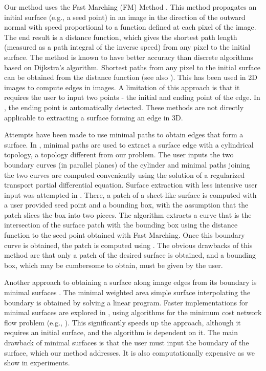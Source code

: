 \documentclass[10pt,journal,compsoc]{IEEEtran}
\begin{document}
Our method uses the Fast Marching (FM) Method
\cite{sethian1996fast}. This method propagates an initial surface
(e.g., a seed point) in an image in the direction of the outward
normal with speed proportional to a function defined at each pixel of
the image. The end result is a distance function, which gives the
shortest path length (measured as a path integral of the inverse
speed) from any pixel to the initial surface. The method is known to
have better accuracy than discrete algorithms based on Dijkstra's
algorithm. Shortest paths from any pixel to the initial surface can be
obtained from the distance function \cite{cohen1997global} (see also
\cite{ulen2015shortest}). This has been used in 2D images to compute
edges in images. A limitation of this approach is that it requires the
user to input two points - the initial and ending point of the
edge. In \cite{kaul2012detecting}, the ending point is automatically
detected. These methods are not directly applicable to extracting a
surface forming an edge in 3D.

Attempts have been made to use minimal paths to obtain edges that form
a surface. In \cite{ardon2005new,ardon2007new}, minimal paths are used
to extract a surface edge with a cylindrical topology, a topology
different from our problem. The user inputs the two boundary curves
(in parallel planes) of the cylinder and minimal paths joining the two
curves are computed conveniently using the solution of a regularized
transport partial differential equation. Surface extraction with less
intensive user input was attempted in
\cite{benmansour2009single}. There, a patch of a sheet-like surface is
computed with a user provided seed point and a bounding box, with the
assumption that the patch slices the box into two pieces. The
algorithm extracts a curve that is the intersection of the surface
patch with the bounding box using the distance function to the seed
point obtained with Fast Marching. Once this boundary curve is
obtained, the patch is computed using \cite{ardon2007new}. The obvious
drawbacks of this method are that only a patch of the desired surface
is obtained, and a bounding box, which may be cumbersome to obtain,
must be given by the user.

Another approach to obtaining a surface along image edges from its
boundary is minimal surfaces \cite{grady2006computing,
  grady2010minimal}. The minimal weighted area simple surface
interpolating the boundary is obtained by solving a linear
program. Faster implementations for minimal surfaces are explored in
\cite{grady2010minimal}, using algorithms for the minimum cost network
flow problem (e.g., \cite{goldberg1997efficient, kovacs2015minimum,
  brunsch2015smoothed, ford2015flows}). This significantly speeds up
the approach, although it requires an initial surface, and the
algorithm is dependent on it.  The main drawback of minimal surfaces
is that the user must input the boundary of the surface, which our
method addresses. It is also computationally expensive as we show in
experiments.
\end{document}

